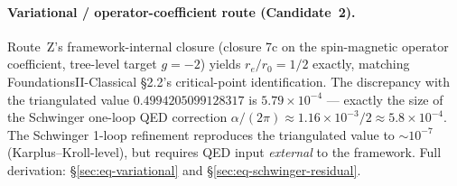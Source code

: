 \paragraph{Variational / operator-coefficient route (Candidate~2).}
Route~Z's framework-internal closure (closure 7c on the spin-magnetic operator
coefficient, tree-level target $g = -2$) yields
$r_e/r_0 = 1/2$ exactly, matching FoundationsII-Classical \S2.2's
critical-point identification. The discrepancy with the triangulated value
$0.4994205099128317$ is $5.79\times 10^{-4}$ --- exactly the size of the
Schwinger one-loop QED correction $\alpha/(2\pi) \approx 1.16\times 10^{-3}/2
\approx 5.8\times 10^{-4}$. The Schwinger 1-loop refinement reproduces the
triangulated value to $\sim 10^{-7}$ (Karplus--Kroll-level), but requires QED
input \emph{external} to the framework. Full derivation:
\S\ref{sec:eq-variational} and \S\ref{sec:eq-schwinger-residual}.

